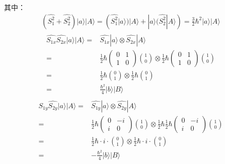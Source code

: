 其中：
\begin{align}
    (\hat{S_1^2}+\hat{S_2^2})|a\rangle|A\rangle=(\hat{S_1^2}|a\rangle)|A\rangle+|a\rangle(\hat{S_2^2}|A\rangle)=\frac{3}{2}\hbar^2|a\rangle|A\rangle
\end{align}
\begin{align}
    \begin{split}
        \widehat{S_{1x}}\widehat{S_{2x}}|a\rangle|A\rangle=&\widehat{S_{1x}}|a\rangle \otimes \widehat{S_{2x}}|A\rangle\\
        =&\frac{1}{2}\hbar \begin{pmatrix}
        0 & 1\\
        1 & 0
        \end{pmatrix}\binom{1}{0}\otimes \frac{1}{2}\hbar \begin{pmatrix}
        0 & 1\\
        1 & 0
        \end{pmatrix}\binom{1}{0}\\
        =&\frac{1}{2}\hbar\binom{0}{1}\otimes \frac{1}{2}\hbar\binom{0}{1}\\
        =&\frac{\hbar^2}{4}|b\rangle|B\rangle
    \end{split}
\end{align}
\begin{align}
    \begin{split}
        \widehat{S_{1y}}\widehat{S_{2y}}|a\rangle|A\rangle=&\widehat{S_{1y}}|a\rangle \otimes \widehat{S_{2y}}|A\rangle\\
        =&\frac{1}{2}\hbar \begin{pmatrix}
        0 & -i\\
        i & 0
        \end{pmatrix}\binom{1}{0}\otimes \frac{1}{2}\hbar \frac{1}{2}\hbar \begin{pmatrix}
        0 & -i\\
        i & 0
        \end{pmatrix}\binom{1}{0}\\
        =&\frac{1}{2}\hbar\cdot i\cdot \binom{0}{1}\otimes \frac{1}{2}\hbar\cdot i \cdot \binom{0}{1}\\
        =&-\frac{\hbar^2}{4}|b\rangle|B\rangle
    \end{split}
\end{align}
